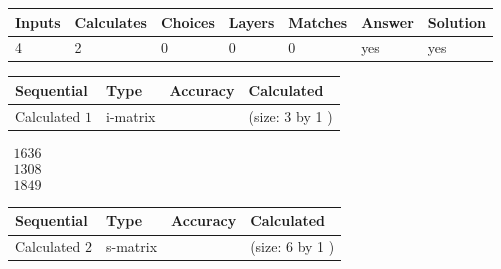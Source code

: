 \documentclass[12pt]{article}
\begin{document}
 
 
\noindent{}
 
 

 
 
 
\noindent{}
 
 

 
 
\noindent{}
 
 

 
\vspace{0.3in}
   
   
   
   
\noindent\begin{tabular}{|l|l|l|l|l|l|l|}
 \hline
Inputs & Calculates & Choices & Layers & Matches & Answer & Solution \\ \hline
 4  & 
 2  & 
 0
  & 
 0  & 
 0  & 
  yes & 
  yes 
  \\ \hline
 \end{tabular}
   
   
   
   
\noindent{}
   
   
  
  
\noindent\begin{tabular}{|l|l|l|l|}
\hline
 Sequential & Type & Accuracy & Calculated \\ 
\hline
 
 
  Calculated $  1 $ & i-matrix &  & 
 (size:  3  by  1 )
 \\  \hline  
 \end{tabular}
   
   
$\begin{array}{
 c
 }
 1636  \\ 
 1308  \\ 
 1849
 \end{array}  $ 
  
  
\noindent\begin{tabular}{|l|l|l|l|}
\hline
 Sequential & Type & Accuracy & Calculated \\ 
\hline
 
 
  Calculated $  2 $ & s-matrix & & 
 (size:  6  by  1 )
 \\  \hline  
 \end{tabular}
   
\end{document}
